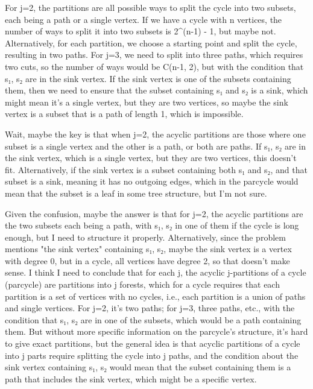 For j=2, the partitions are all possible ways to split the cycle into two subsets, each being a path or a single vertex. If we have a cycle with n vertices, the number of ways to split it into two subsets is 2^(n-1) - 1, but maybe not. Alternatively, for each partition, we choose a starting point and split the cycle, resulting in two paths. For j=3, we need to split into three paths, which requires two cuts, so the number of ways would be C(n-1, 2), but with the condition that {s₁, s₂} are in the sink vertex. If the sink vertex is one of the subsets containing them, then we need to ensure that the subset containing s₁ and s₂ is a sink, which might mean it's a single vertex, but they are two vertices, so maybe the sink vertex is a subset that is a path of length 1, which is impossible. 

Wait, maybe the key is that when j=2, the acyclic partitions are those where one subset is a single vertex and the other is a path, or both are paths. If {s₁, s₂} are in the sink vertex, which is a single vertex, but they are two vertices, this doesn't fit. Alternatively, if the sink vertex is a subset containing both s₁ and s₂, and that subset is a sink, meaning it has no outgoing edges, which in the parcycle would mean that the subset is a leaf in some tree structure, but I'm not sure. 

Given the confusion, maybe the answer is that for j=2, the acyclic partitions are the two subsets each being a path, with {s₁, s₂} in one of them if the cycle is long enough, but I need to structure it properly. Alternatively, since the problem mentions "the sink vertex" containing {s₁, s₂}, maybe the sink vertex is a vertex with degree 0, but in a cycle, all vertices have degree 2, so that doesn't make sense. I think I need to conclude that for each j, the acyclic j-partitions of a cycle (parcycle) are partitions into j forests, which for a cycle requires that each partition is a set of vertices with no cycles, i.e., each partition is a union of paths and single vertices. For j=2, it's two paths; for j=3, three paths, etc., with the condition that {s₁, s₂} are in one of the subsets, which would be a path containing them. But without more specific information on the parcycle's structure, it's hard to give exact partitions, but the general idea is that acyclic partitions of a cycle into j parts require splitting the cycle into j paths, and the condition about the sink vertex containing {s₁, s₂} would mean that the subset containing them is a path that includes the sink vertex, which might be a specific vertex. 

